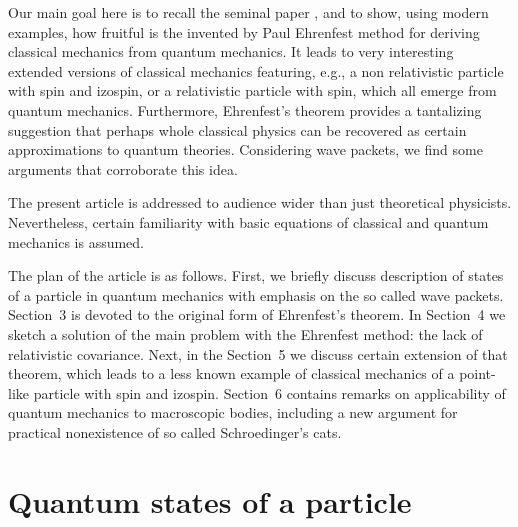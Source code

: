 \documentclass[12pt]{article}
\begin{document}
Our main goal here is to recall the seminal paper \cite{ehr}, and to show, using modern examples, how fruitful is the invented by Paul Ehrenfest method for deriving classical mechanics from quantum mechanics. It leads to very interesting extended versions of classical mechanics featuring, e.g., a non relativistic particle with spin and izospin, or a relativistic particle with spin, which all emerge from quantum mechanics. Furthermore, Ehrenfest's theorem provides a tantalizing suggestion that perhaps whole classical physics can be recovered as certain approximations to quantum theories. Considering wave packets, we find some arguments that corroborate this idea. 

 

The present article is addressed to audience wider than just theoretical physicists. Nevertheless, certain familiarity with basic equations of classical and quantum mechanics is assumed. 






The plan of the article is as follows. First, we briefly discuss description of states of a particle in quantum mechanics with emphasis on the so called wave packets. Section~3 
is devoted to the original form of Ehrenfest's theorem. In Section~4 we sketch a solution of the main problem with the Ehrenfest method: the lack of relativistic covariance. 
Next, in the Section~5 we discuss certain extension of that theorem, which leads to a less known example of classical mechanics of a point-like particle with spin and izospin. Section~6 contains remarks on applicability of quantum mechanics to macroscopic bodies, including a new argument for practical nonexistence of so called Schroedinger's cats. 












\section{ Quantum states of a particle }
\end{document}
